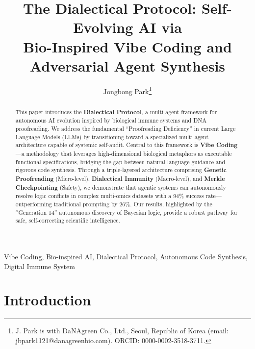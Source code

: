 \documentclass[journal]{IEEEtran}
\begin{document}
\title{The Dialectical Protocol: Self-Evolving AI via \\
Bio-Inspired Vibe Coding and Adversarial Agent Synthesis}

\author{Jongbong Park\thanks{J. Park is with DaNAgreen Co., Ltd., Seoul, Republic of Korea (email: jbpark1121@danagreenbio.com). ORCID: 0000-0002-3518-3711.}
}

\maketitle

\begin{abstract}
This paper introduces the \textbf{Dialectical Protocol}, a multi-agent framework for autonomous AI evolution inspired by biological immune systems and DNA proofreading. We address the fundamental ``Proofreading Deficiency'' in current Large Language Models (LLMs) by transitioning toward a specialized multi-agent architecture capable of systemic self-audit. Central to this framework is \textbf{Vibe Coding}---a methodology that leverages high-dimensional biological metaphors as executable functional specifications, bridging the gap between natural language guidance and rigorous code synthesis. Through a triple-layered architecture comprising \textbf{Genetic Proofreading} (Micro-level), \textbf{Dialectical Immunity} (Macro-level), and \textbf{Merkle Checkpointing} (Safety), we demonstrate that agentic systems can autonomously resolve logic conflicts in complex multi-omics datasets with a 94\% success rate---outperforming traditional prompting by 26\%. Our results, highlighted by the ``Generation 14'' autonomous discovery of Bayesian logic, provide a robust pathway for safe, self-correcting scientific intelligence.
\end{abstract}

\begin{IEEEkeywords}
Vibe Coding, Bio-inspired AI, Dialectical Protocol, 
Autonomous Code Synthesis, Digital Immune System
\end{IEEEkeywords}

\section{Introduction}
\end{document}
